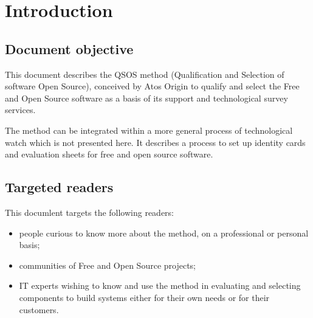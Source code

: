 %
\section{Introduction}

\subsection{Document objective}
This document describes the QSOS method (Qualification and Selection of software Open Source), conceived by Atos Origin to qualify and select the Free and Open Source software as a basis of its support and technological survey services.

The method can be integrated within a more general process of technological watch which is not presented here. It describes a process to set up identity cards and evaluation sheets for free and open source software.

\subsection{Targeted readers}
This documlent targets the following readers:
\begin{itemize}
\item people curious to know more about the method, on a professional or personal basis;
\item communities of Free and Open Source projects;
\item IT experts wishing to know and use the method in evaluating and selecting components to build systems either for their own needs or for their customers.
\end{itemize}


